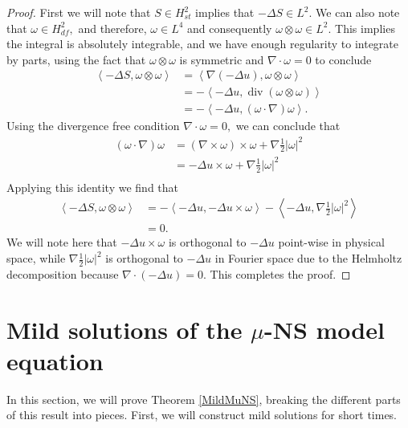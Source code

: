 \documentclass[11pt]{article}
\theoremstyle{plain}
\theoremstyle{remark}
\numberwithin{equation}{section}
\DeclareMathOperator*{\divr}{div}
\begin{document}
\begin{proof}
First we will note that $S\in H^2_{st}$ implies that $-\Delta S\in L^2.$ We can also note that $\omega \in H^2_{df},$ and therefore, $\omega \in L^4$ and consequently $\omega\otimes\omega \in L^2.$ This implies the integral is absolutely integrable, and we have enough regularity to integrate by parts, using the fact that $\omega \otimes \omega$ is symmetric and $\nabla \cdot \omega=0$ to conclude
\begin{align}
    \left<-\Delta S, \omega \otimes \omega\right>&=
    \left<\nabla (-\Delta u), \omega \otimes \omega\right>
    \\ &=
    -\left<-\Delta u, 
    \divr\left(\omega \otimes \omega\right)\right>\\
    &=
    -\left<-\Delta u, 
    (\omega \cdot \nabla)\omega\right>.
\end{align}
Using the divergence free condition $\nabla \cdot \omega=0,$ we can conclude that
\begin{align}
    (\omega \cdot \nabla)\omega&=
    (\nabla \times \omega) \times \omega
    +\nabla\frac{1}{2}|\omega|^2\\
    &=
    -\Delta u \times \omega
    +\nabla\frac{1}{2}|\omega|^2\\
\end{align}
Applying this identity we find that
\begin{align}
    \left<-\Delta S, \omega \otimes \omega\right>&=
    -\left<-\Delta u, -\Delta u \times \omega \right>
    -\left<-\Delta u, \nabla \frac{1}{2}|\omega|^2\right>\\
    &=0.
\end{align}
We will note here that $-\Delta u \times \omega$ is orthogonal to $-\Delta u$ point-wise in physical space, while $\nabla \frac{1}{2}|\omega|^2$ is orthogonal to $-\Delta u$ in Fourier space due to the Helmholtz decomposition because $\nabla \cdot (-\Delta u)=0.$ This completes the proof.
\end{proof}

\section{Mild solutions of the $\mu$-NS model equation} \label{MildSolutions}

In this section, we will prove Theorem \ref{MildMuNS}, breaking the different parts of this result into pieces.
First, we will construct mild solutions for short times.
\end{document}
